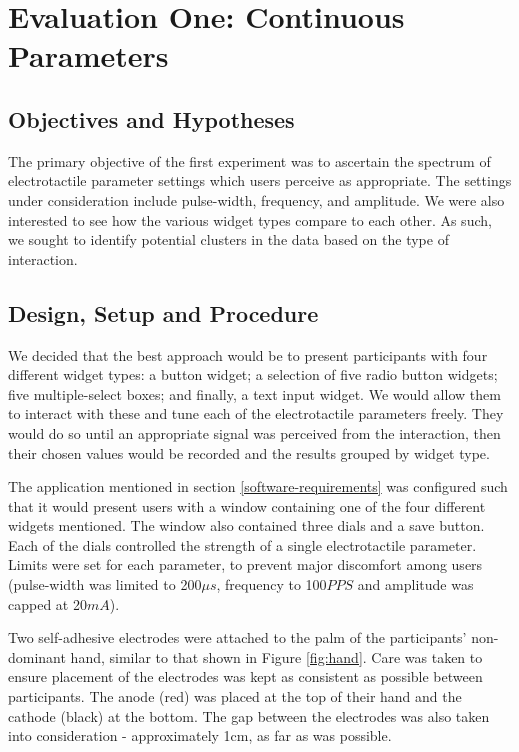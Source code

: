 \documentclass{mpaper}
\begin{document}
\section{Evaluation One: Continuous Parameters} \label{sec:eval-1}
\subsection{Objectives and Hypotheses}
The primary objective of the first experiment was to ascertain the spectrum of electrotactile parameter settings which users perceive as appropriate. The settings under consideration include pulse-width, frequency, and amplitude. We were also interested to see how the various widget types compare to each other. As such, we sought to identify potential clusters in the data based on the type of interaction.

\subsection{Design, Setup and Procedure} \label{sec:design-1}
We decided that the best approach would be to present participants with four different widget types: a button widget; a selection of five radio button widgets; five multiple-select boxes; and finally, a text input widget. We would allow them to interact with these and tune each of the electrotactile parameters freely. They would do so until an appropriate signal was perceived from the interaction, then their chosen values would be recorded and the results grouped by widget type.

The application mentioned in section \ref{software-requirements} was configured such that it would present users with a window containing one of the four different widgets mentioned. The window also contained three dials and a save button. Each of the dials controlled the strength of a single electrotactile parameter. Limits were set for each parameter, to prevent major discomfort among users (pulse-width was limited to 200${\mu}s$, frequency to 100$PPS$ and amplitude was capped at 20$mA$). 

Two self-adhesive electrodes were attached to the palm of the participants' non-dominant hand, similar to that shown in Figure \ref{fig:hand}. Care was taken to ensure placement of the electrodes was kept as consistent as possible between participants. The anode (red) was placed at the top of their hand and the cathode (black) at the bottom. The gap between the electrodes was also taken into consideration - approximately 1cm, as far as was possible.
\end{document}
